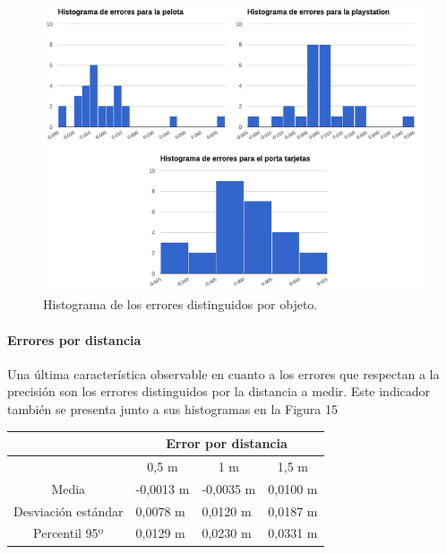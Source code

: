 \documentclass[11pt,a4paper,titlepage]{article}
\newcommand{\Figure}[1]{Figura #1}
\begin{document}
\begin{figure}[h!]

  \centering
    \includegraphics[width=1\textwidth]{f13.png}
  \caption{Histograma de los errores distinguidos por objeto.}
\end{figure}

\paragraph{Errores por distancia}
\hfill \break

Una última característica observable en cuanto a los errores que respectan a la precisión son los errores distinguidos por la distancia a medir. Este indicador también se presenta junto a sus histogramas en la \Figure{15}

\begin{table}[!ht]
\centering
\begin{tabular}{@{}clll@{}}
& \multicolumn{3}{c}{Error por distancia} \\ \midrule
       & \multicolumn{1}{c}{0,5 m} & \multicolumn{1}{c}{1 m} & \multicolumn{1}{c}{1,5 m} \\ \midrule
Media & -0,0013 m & -0,0035 m & 0,0100 m \\ \midrule
Desviación estándar & 0,0078 m & 0,0120 m & 0,0187 m \\ \midrule
Percentil 95º & 0,0129 m & 0,0230 m & 0,0331 m \\ \midrule
\end{tabular}
\end{table}
\end{document}

